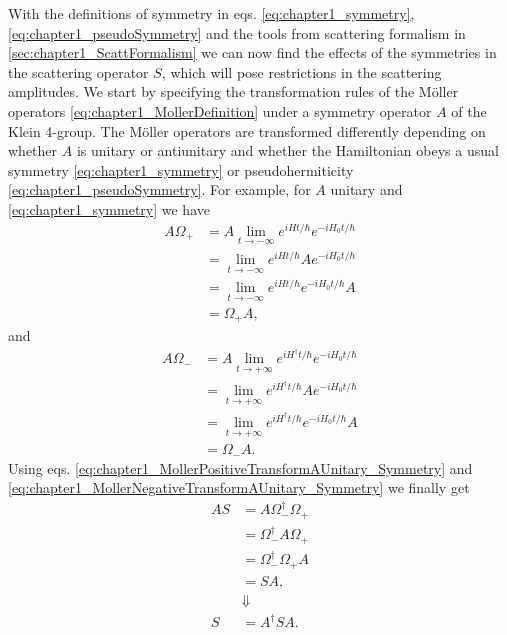With the definitions of symmetry in eqs. \eqref{eq:chapter1_symmetry}, \eqref{eq:chapter1_pseudoSymmetry} and the tools from scattering formalism in \ref{sec:chapter1_ScattFormalism} we can now find the effects of the symmetries in the scattering operator $S$, which will pose restrictions in the scattering amplitudes. We start by specifying the transformation rules of the M\"{o}ller operators \eqref{eq:chapter1_MollerDefinition} under a symmetry operator $A$ of the Klein 4-group. The M\"{o}ller operators are transformed differently depending on whether $A$ is unitary or antiunitary and whether the Hamiltonian obeys a usual symmetry \eqref{eq:chapter1_symmetry} or pseudohermiticity \eqref{eq:chapter1_pseudoSymmetry}. For example, for $A$ unitary and \eqref{eq:chapter1_symmetry} we have
%
\begin{equation}
  \begin{split}
    A \Omega_+ &= A \lim_{t \to -\infty} e^{i H t/\hbar}e^{-i H_0 t/\hbar}\\
    &= \lim_{t \to -\infty}e^{i H t/\hbar}Ae^{-i H_0 t/\hbar}\\
    &= \lim_{t \to -\infty} e^{i H t/\hbar}e^{-i H_0 t/\hbar}A\\
    &= \Omega_+ A,
  \end{split}
  \label{eq:chapter1_MollerPositiveTransformAUnitary_Symmetry}
\end{equation}
%
and
%
\begin{equation}
  \begin{split}
    A \Omega_- &= A \lim_{t \to +\infty} e^{i H^\dagger t/\hbar}e^{-i H_0 t/\hbar}\\
    &= \lim_{t \to +\infty}e^{i H^\dagger t/\hbar}Ae^{-i H_0 t/\hbar}\\
    &= \lim_{t \to +\infty} e^{i H^\dagger t/\hbar}e^{-i H_0 t/\hbar}A\\
    &= \Omega_- A.
  \end{split}
  \label{eq:chapter1_MollerNegativeTransformAUnitary_Symmetry}
\end{equation}
%
Using eqs. \eqref{eq:chapter1_MollerPositiveTransformAUnitary_Symmetry} and \eqref{eq:chapter1_MollerNegativeTransformAUnitary_Symmetry} we finally get
%
\begin{equation}
  \begin{split}
    A S &= A \Omega_{-}^\dagger\Omega_{+} \\
    &= \Omega_{-}^\dagger A \Omega_{+} \\
    &= \Omega_{-}^\dagger\Omega_{+} A \\
    &= S A,\\
    &\Downarrow\\
    S &= A^{\dagger}SA.
  \end{split}
  \label{eq:chapter1_Moller-TransformAUnitary_Symmetry}
\end{equation}
